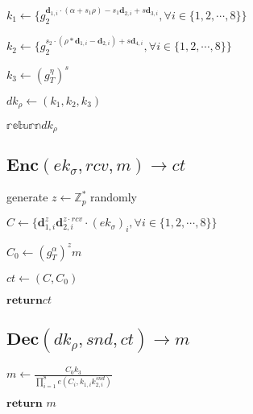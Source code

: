 \documentclass[a4paper]{article}
\begin{document}
$k_1 \gets \{g_2^{\bm{d}_{1, i} \cdot (\alpha + s_1 \rho) - s_1 \bm{d}_{2, i} + s \bm{d}_{3, i}}, \forall i \in \{1, 2, \cdots, 8\}\}$

$k_2 \gets \{g_2^{s_2 \cdot (\rho * \bm{d}_{1, i} - \bm{d}_{2, i}) + s \bm{d}_{4, i}}, \forall i \in \{1, 2, \cdots, 8\}\}$

$k_3 \gets (g_T^\eta)^s$

$\textit{dk}_\rho \gets (k_1, k_2, k_3)$

$\mathbb{return }\textit{dk}_\rho$

\subsection{$\textbf{Enc}(\textit{ek}_\sigma, \textit{rcv}, m) \rightarrow \textit{ct}$}

generate $z \gets \mathbb{Z}_p^*$ randomly

$C \gets \{\bm{d}_{1, i}^z \bm{d}_{2, i}^{z \cdot \textit{rcv}} \cdot (\textit{ek}_\sigma)_i, \forall i \in \{1, 2, \cdots, 8\}\}$

$C_0 \gets (g_T^\alpha)^z m$

$\textit{ct} \gets (C, C_0)$

$\mathbf{return }\textit{ct}$

\subsection{$\textbf{Dec}(\textit{dk}_\rho, \textit{snd}, \textit{ct}) \rightarrow m$}

$m \gets \frac{C_0 k_3}{\prod\limits_{i = 1}^8 e(C_i, k_{1, i} k_{2, i}^\textit{snd})}$

$\textbf{return }m$
\end{document}
